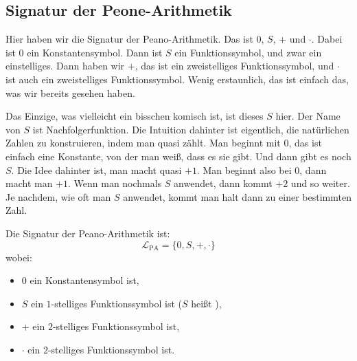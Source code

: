 \subsection{Signatur der Peone-Arithmetik} %
\begin{spoken-clean}[00:06:29 - 00:07:37]
Hier haben wir die Signatur der Peano-Arithmetik. Das ist $0$, $S$, $+$ und $\cdot$. Dabei ist $0$ ein Konstantensymbol. Dann ist $S$ ein Funktionssymbol, und zwar ein einstelliges. Dann haben wir $+$, das ist ein zweistelliges Funktionssymbol, und $\cdot$ ist auch ein zweistelliges Funktionssymbol. Wenig erstaunlich, das ist einfach das, was wir bereits gesehen haben.

Das Einzige, was vielleicht ein bisschen komisch ist, ist dieses $S$ hier. Der Name von $S$ ist Nachfolgerfunktion. Die Intuition dahinter ist eigentlich, die natürlichen Zahlen zu konstruieren, indem man quasi zählt. Man beginnt mit $0$, das ist einfach eine Konstante, von der man weiß, dass es sie gibt. Und dann gibt es noch $S$. Die Idee dahinter ist, man macht quasi $+1$. Man beginnt also bei $0$, dann macht man $+1$. Wenn man nochmals $S$ anwendet, dann kommt $+2$ und so weiter. Je nachdem, wie oft man $S$ anwendet, kommt man halt dann zu einer bestimmten Zahl.
\end{spoken-clean}

\begin{math-stroke}
Die Signatur der Peano-Arithmetik ist:
\[
\mathcal{L}_{\text{PA}} = \{0, S, +, \cdot\}
\]
wobei:
\begin{itemize}
    \item \textbf{$0$} ein Konstantensymbol ist,
    \item \textbf{$S$} ein $1$-stelliges Funktionssymbol ist ($S$ heißt ),
    \item \textbf{$+$} ein $2$-stelliges Funktionssymbol ist,
    \item \textbf{$\cdot$} ein $2$-stelliges Funktionssymbol ist.
\end{itemize}
\end{math-stroke}


